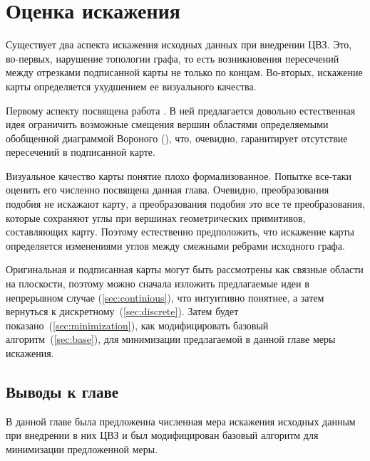 \chapter{Оценка искажения}

Существует два аспекта искажения исходных данных при внедрении ЦВЗ. Это, во-первых, нарушение топологии графа,
то есть возникновения пересечений между отрезками подписанной карты не только по концам. Во-вторых, искажение
карты определяется ухудшением ее визуального качества.

Первому аспекту посвящена работа \cite{Huber}. В ней предлагается довольно естественная идея ограничить 
возможные смещения вершин областями определяемыми обобщенной диаграммой Вороного (\cite{Held}), что, очевидно,
гаранитирует отсутствие пересечений в подписанной карте.

Визуальное качество карты понятие плохо формализованное. Попытке все-таки оценить его численно посвящена данная
глава. Очевидно, преобразования подобия не искажают карту, а преобразования подобия это все те преобразования, 
которые сохраняют углы при вершинах геометрических 
примитивов, составляющих карту. Поэтому естественно предположить, что искажение карты определяется изменениями
углов между смежными ребрами исходного графа.

Оригинальная и подписанная карты могут быть рассмотрены как связные области на плоскости, поэтому можно сначала
изложить предлагаемые идеи в непрерывном случае (\ref{sec:continious}), что интуитивно понятнее, а затем вернуться к 
дискретному~(\ref{sec:discrete}). Затем будет показано~(\ref{sec:minimization}), как модифицировать 
базовый алгоритм~(\ref{sec:base}), для минимизации предлагаемой в данной главе меры искажения.





\section{Выводы к главе}
В данной главе была предложенна численная мера искажения исходных данным при внедрении в них ЦВЗ
и был модифицирован базовый алгоритм для минимизации предложенной меры.
